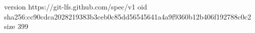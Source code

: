 version https://git-lfs.github.com/spec/v1
oid sha256:cc90cdca2028219383b3ceb0c85dd56545641a4a9f9360b12b406f192788c0c2
size 399
